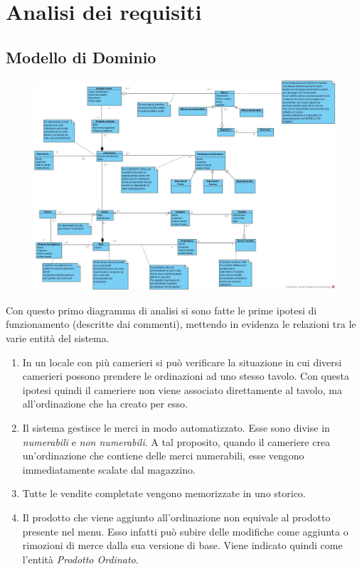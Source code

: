 \chapter{Analisi dei requisiti}
\label{analisi}

\section{Modello di Dominio}
\begin{figure}[H]
	\centering
	\includegraphics[width=1\textwidth]{Immagini/modello_dominio.jpg}
\end{figure}
Con questo primo diagramma di analisi si sono fatte le prime ipotesi di funzionamento (descritte dai commenti), mettendo in evidenza le relazioni tra le varie entità del sistema.

\begin{enumerate}
	\item In un locale con più camerieri si può verificare la situazione in cui diversi camerieri possono prendere le ordinazioni ad uno stesso tavolo. Con questa ipotesi quindi il cameriere non viene associato direttamente al tavolo, ma all'ordinazione che ha creato per esso.
	\item Il sistema gestisce le merci in modo automatizzato. Esse sono divise in \textit{numerabili} e \textit{non numerabili}. A tal proposito, quando il cameriere crea un'ordinazione che contiene delle merci numerabili, esse vengono immediatamente scalate dal magazzino.
	\item Tutte le vendite completate vengono memorizzate in uno storico.
	\item Il prodotto che viene aggiunto all'ordinazione non equivale al prodotto presente nel menu. Esso infatti può subire delle modifiche come aggiunta o rimozioni di merce dalla sua versione di base. Viene indicato quindi come l'entità \textit{Prodotto Ordinato}.
\end{enumerate}

